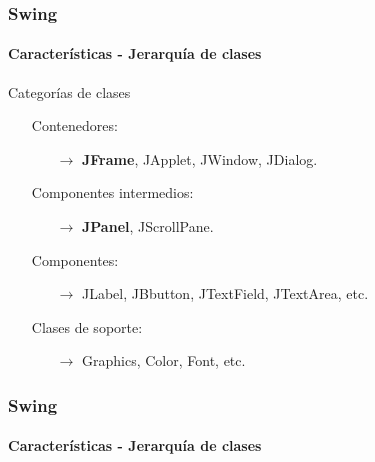 \documentclass{beamer}
\begin{document}
	\begin{frame}
		\frametitle{Swing}
		\framesubtitle{Caracter\'isticas - Jerarqu\'ia de clases}

		Categor\'ias de clases
		\begin{itemize}
		    \item[\checkmark] Contenedores:
		    \begin{itemize}
        		    \item[$\rightarrow$] \textbf{JFrame}, JApplet, JWindow, JDialog.
        		\end{itemize}
		    \item[\checkmark] Componentes intermedios:
		    \begin{itemize}
        		    \item[$\rightarrow$] \textbf{JPanel}, JScrollPane.
        		\end{itemize}
		    \item[\checkmark] Componentes:
		    \begin{itemize}
        		    \item[$\rightarrow$] JLabel, JBbutton, JTextField, JTextArea, etc.
        		\end{itemize}
		    \item[\checkmark] Clases de soporte:
		    \begin{itemize}
        		    \item[$\rightarrow$] Graphics, Color, Font, etc.
        		\end{itemize}
		\end{itemize}
	\end{frame}

    \begin{frame}
		\frametitle{Swing}
		\framesubtitle{Caracter\'isticas - Jerarqu\'ia de clases}
		\begin{center}
		\end{center}
	\end{frame}
\end{document}
